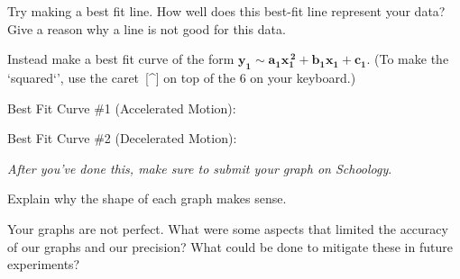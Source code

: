\documentclass[10pt]{exam}
\begin{document}
\begin{questions}

  \question
    Try making a best fit line.  How well does this best-fit line represent your data?  Give a reason why a line is not good for this data.
    \vs

  \question
    Instead make a best fit curve of the form 
    $\mathbf{y_1\sim a_1 x_1^{\,2}+b_1 x_1+c_1}$.  (To make the `squared`', use the caret~[\string^\string] on top of the 6 on your keyboard.)
    
    \vspace{1em}

    Best Fit Curve \#1 (Accelerated Motion):

    \vspace{3em}

    Best Fit Curve \#2 (Decelerated Motion):

    \vspace{3em}

    \emph{After you've done this, make sure to submit your graph on Schoology}.
    
    \vspace{4em}
      
  \question
    Explain why the shape of each graph makes sense.  
    \vs

  
  \question
    Your graphs are not perfect.  What were some aspects that limited the accuracy of our graphs and our precision?  What could be done to mitigate these in future experiments?
    \vs
  
  


\end{questions}
\end{document}
